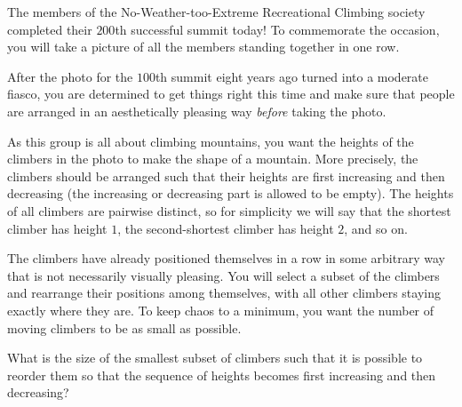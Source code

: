 




The members of the No-Weather-too-Extreme Recreational Climbing society
completed their $200$th successful summit today! To commemorate the occasion,
you will take a picture of all the members standing together in one row.

After the photo for the $100$th summit eight years ago turned into a moderate
fiasco, you are determined to get things right this time and make sure that
people are arranged in an aesthetically pleasing way \textit{before} taking the
photo.

As this group is all about climbing mountains, you want the heights of the
climbers in the photo to make the shape of a mountain. More
precisely, the climbers
should be arranged such that their heights are first increasing and then
decreasing (the increasing or decreasing part is allowed to be empty). The
heights of all climbers are pairwise distinct, so for simplicity we will say
that the shortest climber has height $1$, the second-shortest climber has
height $2$, and so on.

The climbers have already positioned themselves in a row in some arbitrary way
that is not necessarily visually pleasing. You will select a subset of the
climbers and rearrange their positions among themselves, with all other climbers
staying exactly where they are. To keep chaos to a minimum, you want the number
of moving climbers to be as small as possible.

What is the size of the smallest subset of climbers such that it is possible
to reorder them so that the sequence of heights becomes first increasing and then
decreasing?

